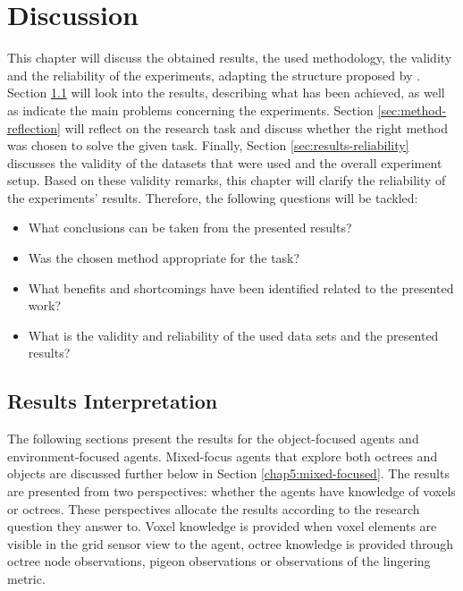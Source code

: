 \chapter{Discussion}\label{chap:discussion}



This chapter will discuss the obtained results, the used methodology, the validity and the reliability of the experiments, adapting the structure proposed by \textcite{luckert2016using}. Section \ref{sec:results-interpretation} will look into the results, describing what has been achieved, as well as indicate the main problems concerning the experiments. Section \ref{sec:method-reflection} will reflect on the research task and discuss whether the right method was chosen to solve the given task. Finally, Section \ref{sec:results-reliability} discusses the validity of the datasets that were used and the overall experiment setup. Based on these validity remarks, this chapter will clarify the reliability of the experiments' results. Therefore, the following questions will be tackled:
\begin{itemize}
    \item What conclusions can be taken from the presented results?
    \item Was the chosen method appropriate for the task?
    \item What benefits and shortcomings have been identified related to the presented work?
    \item What is the validity and reliability of the used data sets and the presented results?
\end{itemize}


\section{Results Interpretation}\label{sec:results-interpretation}

 The following sections present the results for the object-focused agents and environment-focused agents. Mixed-focus agents that explore both octrees and objects are discussed further below in Section \ref{chap5:mixed-focused}. The results are presented from two perspectives: whether the agents have knowledge of voxels or octrees. These perspectives allocate the results according to the research question they answer to. 
 Voxel knowledge is provided when voxel elements are visible in the grid sensor view to the agent, octree knowledge is provided through octree node observations, pigeon observations or observations of the lingering metric.
 
